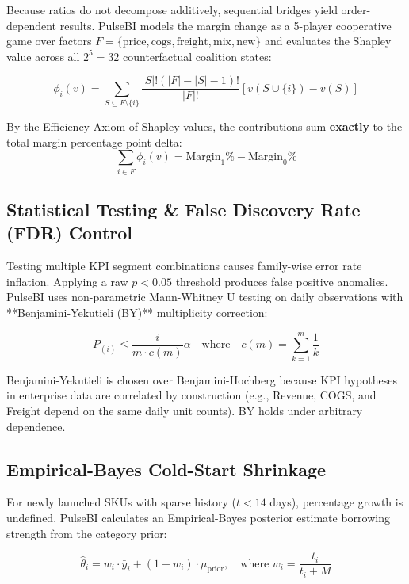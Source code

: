 \documentclass[11pt,a4paper]{article}
\begin{document}
Because ratios do not decompose additively, sequential bridges yield order-dependent results. PulseBI models the margin change as a 5-player cooperative game over factors $F = \{\text{price}, \text{cogs}, \text{freight}, \text{mix}, \text{new}\}$ and evaluates the Shapley value across all $2^5 = 32$ counterfactual coalition states:

\begin{equation}
\phi_i(v) = \sum_{S \subseteq F \setminus \{i\}} \frac{|S|!(|F| - |S| - 1)!}{|F|!} \left[ v(S \cup \{i\}) - v(S) \right]
\end{equation}

By the Efficiency Axiom of Shapley values, the contributions sum \textbf{exactly} to the total margin percentage point delta:
\begin{equation}
\sum_{i \in F} \phi_i(v) = \text{Margin}_1\% - \text{Margin}_0\%
\end{equation}

\subsection{Statistical Testing \& False Discovery Rate (FDR) Control}
Testing multiple KPI segment combinations causes family-wise error rate inflation. Applying a raw $p < 0.05$ threshold produces false positive anomalies. PulseBI uses non-parametric Mann-Whitney U testing on daily observations with **Benjamini-Yekutieli (BY)** multiplicity correction:

\begin{equation}
P_{(i)} \le \frac{i}{m \cdot c(m)} \alpha \quad \text{where} \quad c(m) = \sum_{k=1}^{m} \frac{1}{k}
\end{equation}

Benjamini-Yekutieli is chosen over Benjamini-Hochberg because KPI hypotheses in enterprise data are correlated by construction (e.g., Revenue, COGS, and Freight depend on the same daily unit counts). BY holds under arbitrary dependence.

\subsection{Empirical-Bayes Cold-Start Shrinkage}
For newly launched SKUs with sparse history ($t < 14$ days), percentage growth is undefined. PulseBI calculates an Empirical-Bayes posterior estimate borrowing strength from the category prior:

\begin{equation}
\hat{\theta}_i = w_i \cdot \bar{y}_i + (1 - w_i) \cdot \mu_{\text{prior}}, \quad \text{where } w_i = \frac{t_i}{t_i + M}
\end{equation}
\end{document}
